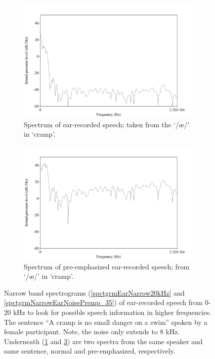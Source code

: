 \begin{figure}[h!]
\begin{subfigure}{0.475\textwidth}
  \centering
  \includegraphics[width=1\linewidth]{figure/spctrmEar20k.png}
  \caption{Spectrum of ear-recorded speech; taken from the `/\ae/' in `cramp'.}
  \label{spctrmEar20kHz}
\end{subfigure}%
\hfill
\begin{subfigure}{0.475\textwidth}
  \centering
  \includegraphics[width=1\linewidth]{figure/spctrmEar20k_preemp.png}
  \caption{Spectrum of pre-emphasized ear-recorded speech; from `/\ae/' in `cramp'.}
  \label{spctrmEar20kPreemp}
\end{subfigure}
\caption{Narrow band spectrograms (\ref{spctgrmEarNarrow20kHz} and \ref{spctgrmNarrowEarNoisePremp_35}) of ear-recorded speech from 0-20 kHz to look for possible speech information in higher frequencies. The sentence ``A cramp is no small danger on a swim'' spoken by a female participant. Note, the noise only extends to 8 kHz. Underneath (\ref{spctrmEar20kHz} and \ref{spctrmEar20kPreemp}) are two spectra from the same speaker and same sentence, normal and pre-emphasized, respectively.}
\end{figure}

